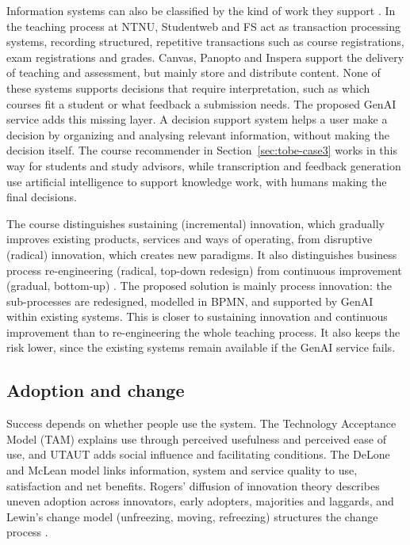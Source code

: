 Information systems can also be classified by the kind of work they support \parencite{stair}. In the teaching process at NTNU, Studentweb and FS act as transaction processing systems, recording structured, repetitive transactions such as course registrations, exam registrations and grades. Canvas, Panopto and Inspera support the delivery of teaching and assessment, but mainly store and distribute content. None of these systems supports decisions that require interpretation, such as which courses fit a student or what feedback a submission needs. The proposed GenAI service adds this missing layer. A decision support system helps a user make a decision by organizing and analysing relevant information, without making the decision itself. The course recommender in Section~\ref{sec:tobe-case3} works in this way for students and study advisors, while transcription and feedback generation use artificial intelligence to support knowledge work, with humans making the final decisions.

The course distinguishes sustaining (incremental) innovation, which gradually improves existing products, services and ways of operating, from disruptive (radical) innovation, which creates new paradigms. It also distinguishes business process re-engineering (radical, top-down redesign) from continuous improvement (gradual, bottom-up) \parencite{toussaint2025}. The proposed solution is mainly process innovation: the sub-processes are redesigned, modelled in BPMN, and supported by GenAI within existing systems. This is closer to sustaining innovation and continuous improvement than to re-engineering the whole teaching process. It also keeps the risk lower, since the existing systems remain available if the GenAI service fails.

\subsection{Adoption and change}\label{sec:adoption}

Success depends on whether people use the system. The Technology Acceptance Model (TAM) explains use through perceived usefulness and perceived ease of use, and UTAUT adds social influence and facilitating conditions. The DeLone and McLean model links information, system and service quality to use, satisfaction and net benefits. Rogers' diffusion of innovation theory describes uneven adoption across innovators, early adopters, majorities and laggards, and Lewin's change model (unfreezing, moving, refreezing) structures the change process \parencite{stair,toussaint2025}.

